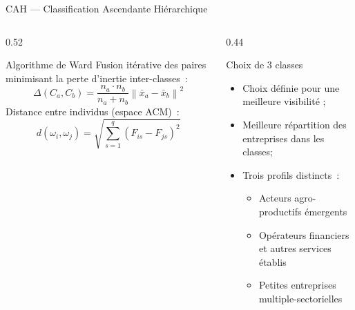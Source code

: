 \documentclass[aspectratio=169, 10pt]{beamer}
\begin{document}
\begin{frame}{CAH — Classification Ascendante Hiérarchique}
    \begin{columns}[T]
        \begin{column}{0.52\textwidth}
            \begin{block}{Algorithme de Ward}
                Fusion itérative des paires minimisant la
                perte d'inertie inter-classes~:
                \[
                    \Delta(C_a, C_b)
                    = \frac{n_a \cdot n_b}{n_a + n_b}
                      \left\|\bar{x}_a - \bar{x}_b\right\|^2
                \]
                Distance entre individus (espace ACM)~:
                \[
                    d(\omega_i, \omega_j)
                    = \sqrt{\sum_{s=1}^{q}(F_{is} - F_{js})^2}
                \]
            \end{block}
        \end{column}
        \begin{column}{0.44\textwidth}
            \begin{exampleblock}{Choix de 3 classes}
                \begin{itemize}
                    \item Choix définie pour une meilleure visibilité  ;
                    \item Meilleure répartition des entreprises dans les classes;
                    \item Trois profils distincts~:
                          \begin{itemize}
                              \item[\textbullet] Acteurs agro-productifs émergents
                              \item[\textbullet]  Opérateurs
                              financiers et autres services établis
                              \item[\textbullet]  Petites entreprises multiple-sectorielles
                          \end{itemize}
                \end{itemize}
            \end{exampleblock}
        \end{column}
    \end{columns}
\end{frame}
\end{document}
